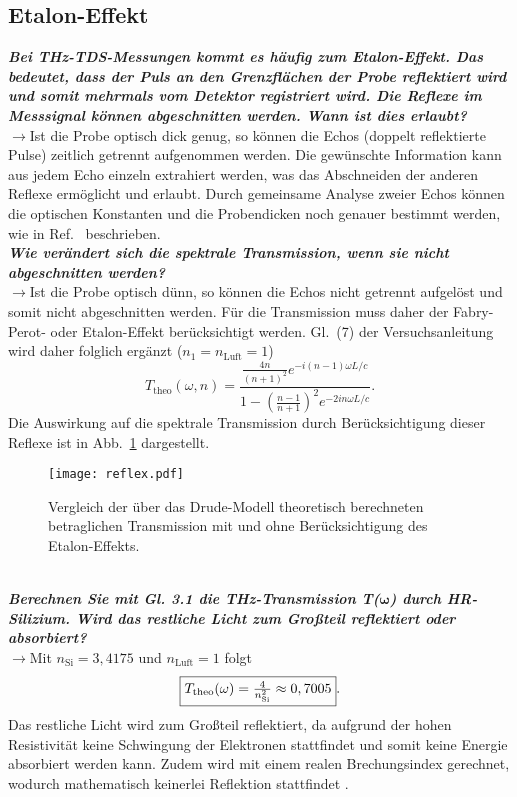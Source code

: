 \subsection{\label{subsec:FZV7}Etalon-Effekt}
\textbf{\textit{Bei THz-TDS-Messungen kommt es häufig zum Etalon-Effekt. Das bedeutet, dass
der Puls an den Grenzflächen der Probe reflektiert wird und somit mehrmals vom
Detektor registriert wird. Die Reflexe im Messsignal können abgeschnitten werden.
Wann ist dies erlaubt?}}\\
$\rightarrow$Ist die Probe optisch dick genug, so können die Echos (doppelt reflektierte Pulse) 
zeitlich getrennt aufgenommen werden. 
Die gewünschte Information kann aus jedem Echo einzeln extrahiert werden, was das Abschneiden 
der anderen Reflexe ermöglicht und erlaubt. Durch gemeinsame Analyse zweier Echos können 
die optischen Konstanten und die Probendicken noch genauer bestimmt werden, wie in 
Ref.~\cite{Q9} beschrieben.\\

\textbf{\textit{Wie verändert sich die spektrale Transmission, wenn sie
nicht abgeschnitten werden?}}\\
$\rightarrow$Ist die Probe optisch dünn, so können die Echos nicht getrennt aufgelöst und somit 
nicht abgeschnitten werden. Für die Transmission muss daher der Fabry-Perot- oder Etalon-Effekt
berücksichtigt werden. Gl.~(7) der Versuchsanleitung wird daher folglich ergänzt 
($n_{1}=n_{\text{Luft}}=1$) \cite{Q9}
\begin{equation}
    T_{\text{theo}}(\omega, n) = \frac{\frac{4n}{(n+1)^{2}}e^{-i(n-1)\omega L/c}}{1-\left(\frac{n-1}{n+1}\right)^{2}e^{-2in\omega L/c}}. 
\end{equation}
Die Auswirkung auf die spektrale Transmission durch Berücksichtigung dieser Reflexe ist in Abb.~\ref{fig:reflex} dargestellt.
\begin{figure}[h!]
    \centering
    \texttt{[image: reflex.pdf]}
    \caption{\label{fig:reflex}Vergleich der über das Drude-Modell theoretisch 
    berechneten betraglichen Transmission mit und ohne Berücksichtigung des Etalon-Effekts.}
\end{figure} \FloatBarrier \,\\

\textbf{\textit{Berechnen Sie mit Gl. 3.1 die THz-Transmission T($\mathbf{\omega}$) durch HR-Silizium. Wird
das restliche Licht zum Großteil reflektiert oder absorbiert?}}\\
$\rightarrow$Mit $n_{\text{Si}}=3,4175$ und $n_{\text{Luft}}=1$ folgt
\begin{equation}
    \fbox{$T_{\text{theo}}(\omega) = \frac{4}{n_{\text{Si}}^{2}} \approx 0,7005$}.
\end{equation}
Das restliche Licht wird zum Großteil reflektiert, da aufgrund der hohen Resistivität keine 
Schwingung der Elektronen stattfindet und somit keine Energie absorbiert werden kann. 
Zudem wird mit einem realen Brechungsindex gerechnet, wodurch mathematisch 
keinerlei Reflektion stattfindet \cite{EPC}. 
